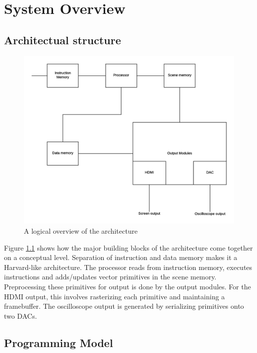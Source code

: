 \chapter{System Overview}

\section{Architectual structure}

\begin{figure}[h!]
    \includegraphics[width=\linewidth]{images/system-overview.png}
    \caption{A logical overview of the \vthreek architecture}
    \label{fig:system-overview}
\end{figure}

Figure \ref{fig:system-overview} shows how the major building blocks of the \vthreek architecture come together on a conceptual level.
Separation of instruction and data memory makes it a Harvard-like architecture.
The processor reads from instruction memory, executes instructions and adds/updates vector primitives in the scene memory.
Preprocessing these primitives for output is done by the output modules.
For the HDMI output, this involves rasterizing each primitive and maintaining a framebuffer.
The oscilloscope output is generated by serializing primitives onto two DACs.



\section{Programming Model}

